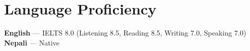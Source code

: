 \documentclass[letterpaper,11pt]{article}
\begin{document}
\section{Language Proficiency}
 \begin{itemize}[leftmargin=0.15in, label={}]
    \small{\item{
     \textbf{English} --- IELTS 8.0 (Listening 8.5, Reading 8.5, Writing 7.0, Speaking 7.0) \\
     \textbf{Nepali} --- Native
    }}
 \end{itemize}
\end{document}
